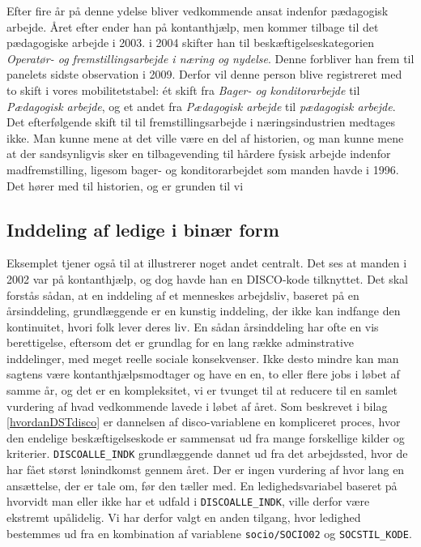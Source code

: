 Efter fire år på denne ydelse bliver vedkommende ansat indenfor pædagogisk arbejde. Året efter ender han på kontanthjælp, men kommer tilbage til det pædagogiske arbejde i 2003. i 2004 skifter han til beskæftigelseskategorien \emph{Operatør- og fremstillingsarbejde i næring og nydelse}. Denne forbliver han frem til panelets sidste observation i 2009. Derfor vil denne person blive registreret med to skift i vores mobilitetstabel: ét skift fra \emph{Bager- og konditorarbejde} til \emph{Pædagogisk arbejde}, og et andet fra \emph{Pædagogisk arbejde} til \emph{pædagogisk arbejde}. Det efterfølgende skift til til fremstillingsarbejde i næringsindustrien medtages ikke. Man kunne mene at det ville være en del af historien, og man kunne mene at der sandsynligvis sker en tilbagevending til hårdere fysisk arbejde indenfor madfremstilling, ligesom bager- og konditorarbejdet som manden havde i 1996. Det hører med til historien, og er grunden til vi %

\subsection{Inddeling af ledige i binær form}

Eksemplet tjener også til at illustrerer noget andet centralt. Det ses at manden i 2002 var på kontanthjælp, og dog havde han en DISCO-kode tilknyttet. Det skal forstås sådan, at en inddeling af et menneskes arbejdsliv, baseret på en årsinddeling, grundlæggende er en kunstig inddeling, der ikke kan indfange den kontinuitet, hvori folk lever deres liv. En sådan årsinddeling har ofte en vis berettigelse, eftersom det er grundlag for en lang række adminstrative inddelinger, med meget reelle sociale konsekvenser. Ikke desto mindre kan man sagtens være kontanthjælpsmodtager og have en en, to eller flere jobs i løbet af samme år, og det er en kompleksitet, vi er tvunget til at reducere til en samlet vurdering af hvad vedkommende lavede i løbet af året. Som beskrevet i bilag \ref{hvordanDSTdisco} er dannelsen af disco-variablene en kompliceret proces, hvor den endelige beskæftigelseskode er sammensat ud fra mange forskellige kilder og kriterier. \texttt{DISCOALLE\_INDK} grundlæggende dannet ud fra det arbejdssted, hvor de har fået størst lønindkomst gennem året. Der er ingen vurdering af hvor lang en ansættelse, der er tale om, før den tæller med. En ledighedsvariabel baseret på hvorvidt man eller ikke har et udfald i \texttt{DISCOALLE\_INDK}, ville derfor være ekstremt upålidelig. Vi har derfor valgt en anden tilgang, hvor ledighed bestemmes ud fra en kombination af variablene \texttt{socio/SOCIO02} og \texttt{SOCSTIL\_KODE}.

